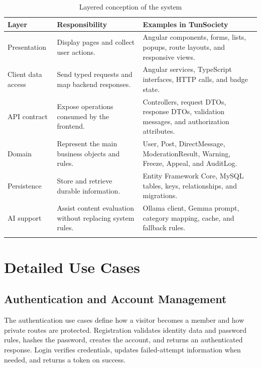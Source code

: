 \begin{longtable}{|m{3.1cm}|m{5.2cm}|m{5.7cm}|}
\hline
\textbf{Layer} & \textbf{Responsibility} & \textbf{Examples in TunSociety} \\
\hline
Presentation & Display pages and collect user actions. & Angular components, forms, lists, popups, route layouts, and responsive views. \\
\hline
Client data access & Send typed requests and map backend responses. & Angular services, TypeScript interfaces, HTTP calls, and badge state. \\
\hline
API contract & Expose operations consumed by the frontend. & Controllers, request DTOs, response DTOs, validation messages, and authorization attributes. \\
\hline
Domain & Represent the main business objects and rules. & User, Post, DirectMessage, ModerationResult, Warning, Freeze, Appeal, and AuditLog. \\
\hline
Persistence & Store and retrieve durable information. & Entity Framework Core, MySQL tables, keys, relationships, and migrations. \\
\hline
AI support & Assist content evaluation without replacing system rules. & Ollama client, Gemma prompt, category mapping, cache, and fallback rules. \\
\hline
\caption{Layered conception of the system}
\end{longtable}

\section{Detailed Use Cases}

\subsection{Authentication and Account Management}

The authentication use cases define how a visitor becomes a member and how private routes are protected. Registration validates identity data and password rules, hashes the password, creates the account, and returns an authenticated response. Login verifies credentials, updates failed-attempt information when needed, and returns a token on success.

